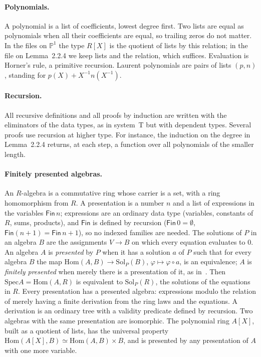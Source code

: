 \documentclass[11pt]{article}
\newcommand{\PP}{\mathbb{P}^1}
\newcommand{\Spec}{\mathrm{Spec}}
\theoremstyle{remark}
\begin{document}
\paragraph{Polynomials.} A polynomial is a list of coefficients, lowest
degree first. Two lists are equal as polynomials when all their
coefficients are equal, so trailing zeros do not matter. In the files on
$\PP$ the type $R[X]$ is the quotient of lists by this relation; in the
file on Lemma~2.2.4 we keep lists and the relation, which suffices.
Evaluation is Horner's rule, a primitive recursion. Laurent polynomials
are pairs of lists $(p,n)$, standing for $p(X) + X^{-1}n(X^{-1})$.

\paragraph{Recursion.} All recursive definitions and all proofs by
induction are written with the eliminators of the data types, as in
system~T but with dependent types. Several proofs use recursion at
higher type. For instance, the induction on the degree in
Lemma~2.2.4 returns, at each step, a function over all polynomials of
the smaller length.

\paragraph{Finitely presented algebras.} An $R$-algebra is a commutative
ring whose carrier is a set, with a ring homomorphism from $R$. A
presentation is a number $n$ and a list of expressions in the variables
$\mathsf{Fin}\,n$; expressions are an ordinary data type (variables,
constants of $R$, sums, products), and $\mathsf{Fin}$ is defined by
recursion ($\mathsf{Fin}\,0=\emptyset$, $\mathsf{Fin}(n+1)=\mathsf{Fin}\,n+1$),
so no indexed families are needed. The solutions of $P$ in an algebra $B$
are the assignments $V\to B$ on which every equation evaluates to $0$.
An algebra $A$ is \emph{presented} by $P$ when it has a solution $a$ of
$P$ such that for every algebra $B$ the map
$\mathrm{Hom}(A,B)\to\mathrm{Sol}_P(B)$, $\varphi\mapsto\varphi\circ a$, is
an equivalence; $A$ is \emph{finitely presented} when merely there is a
presentation of it, as in~\cite[Definition 1.3.2]{SAG}. Then
$\Spec A=\mathrm{Hom}(A,R)$ is equivalent to $\mathrm{Sol}_P(R)$, the
solutions of the equations in $R$. Every presentation has a presented
algebra: expressions modulo the relation of merely having a finite
derivation from the ring laws and the equations. A derivation is an
ordinary tree with a validity predicate defined by recursion. Two algebras
with the same presentation are isomorphic. The polynomial ring $A[X]$,
built as a quotient of lists, has the universal property
$\mathrm{Hom}(A[X],B)\simeq\mathrm{Hom}(A,B)\times B$, and is presented by
any presentation of $A$ with one more variable.
\end{document}
